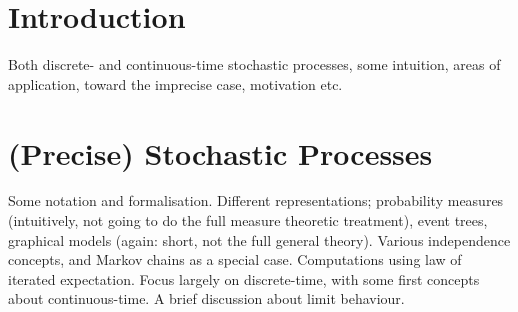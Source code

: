 \documentclass[11pt]{article}
\begin{document}
%

\section{Introduction}
Both discrete- and continuous-time stochastic processes, some intuition, areas of application, toward the imprecise case, motivation etc.

\section{(Precise) Stochastic Processes}
Some notation and formalisation. Different representations; probability measures (intuitively, not going to do the full measure theoretic treatment), event trees, graphical models (again: short, not the full general theory). Various independence concepts, and Markov chains as a special case. Computations using law of iterated expectation. Focus largely on discrete-time, with some first concepts about continuous-time. A brief discussion about limit behaviour.
\end{document}
